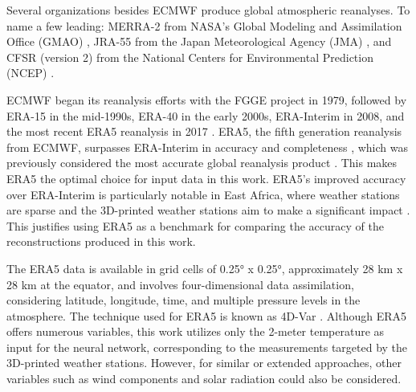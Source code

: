 Several organizations besides ECMWF produce global atmospheric reanalyses. To name a few leading: MERRA-2 from NASA's Global Modeling and Assimilation Office (GMAO) \cite{Gelaro2017}, JRA-55 from the Japan Meteorological Agency (JMA) \cite{Kobayashi2015}, and CFSR (version 2) from the National Centers for Environmental Prediction (NCEP) \cite{Saha2014}.

ECMWF began its reanalysis efforts with the FGGE project in 1979, followed by ERA-15 in the mid-1990s, ERA-40 in the early 2000s, ERA-Interim in 2008, and the most recent ERA5 reanalysis in 2017 \cite{Hersbach2020ERA5quality}. ERA5, the fifth generation reanalysis from ECMWF, surpasses ERA-Interim in accuracy and completeness \cite{Hersbach2020ERA5quality}, which was previously considered the most accurate global reanalysis product \cite{Beck2019interimWasBest}. This makes ERA5 the optimal choice for input data in this work. ERA5's improved accuracy over ERA-Interim is particularly notable in East Africa, where weather stations are sparse and the 3D-printed weather stations aim to make a significant impact \cite{Gleixner2020ERA5africa}. This justifies using ERA5 as a benchmark for comparing the accuracy of the reconstructions produced in this work.

The ERA5 data is available in grid cells of 0.25° x 0.25°, approximately 28 km x 28 km at the equator, and involves four-dimensional data assimilation, considering latitude, longitude, time, and multiple pressure levels in the atmosphere. The technique used for ERA5 is known as 4D-Var \cite{era5}. Although ERA5 offers numerous variables, this work utilizes only the 2-meter temperature as input for the neural network, corresponding to the measurements targeted by the 3D-printed weather stations. However, for similar or extended approaches, other variables such as wind components and solar radiation could also be considered.